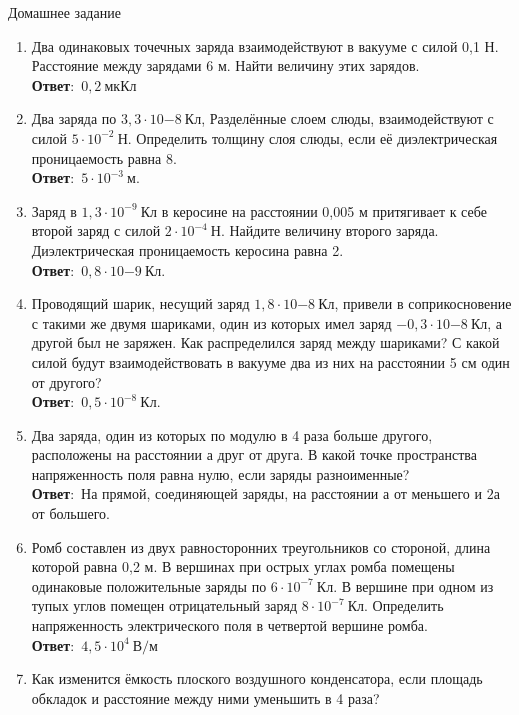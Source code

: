 \documentclass[a6paper, 11pt]{diss_4}
\renewcommand{\'}{\,'}
\begin{document}
\begin{center}
   Домашнее задание
\end{center}
\begin{enumerate}
\item Два одинаковых точечных заряда взаимодействуют в вакууме с силой 0,1 Н. Расстояние между зарядами 6 м. Найти величину этих зарядов.
\\\textbf{Ответ}:\ $0,2\ мкКл$
\item Два заряда по $3,3\cdot10{-8}\ Кл$, Разделённые слоем слюды, взаимодействуют с силой $5\cdot10^{-2}\ Н$. Определить толщину слоя слюды, если её диэлектрическая проницаемость равна 8.
\\\textbf{Ответ}:\ $5\cdot10^{-3}\ м$.
\item Заряд в $1,3\cdot10^{-9}\ Кл$ в керосине на расстоянии 0,005 м притягивает к себе второй заряд с силой $2\cdot10^{-4}\ Н$. Найдите величину второго заряда. Диэлектрическая проницаемость керосина равна 2.
\\\textbf{Ответ}:\ $0,8\cdot10{-9}\ Кл$.
\item Проводящий шарик, несущий заряд $1,8\cdot10{-8}\ Кл$, привели в соприкосновение с такими же двумя шариками, один из которых имел заряд $-0,3\cdot10{-8}\ Кл$, а другой был не заряжен. Как распределился заряд между шариками? С какой силой будут взаимодействовать в вакууме два из них на расстоянии 5 см один от другого?
\\\textbf{Ответ}:\ $0,5\cdot10^{-8}\ Кл$.
\item Два заряда, один из которых по модулю в 4 раза больше другого, расположены на расстоянии а друг от друга. В какой точке пространства напряженность поля равна нулю, если заряды разноименные?
\\\textbf{Ответ}:\  На прямой, соединяющей заряды, на расстоянии $а$ от меньшего и $2а$ от большего.
\item Ромб составлен из двух равносторонних треугольников со стороной, длина которой равна 0,2 м. В вершинах при острых углах ромба помещены одинаковые положительные заряды по $6\cdot10^{-7}\ Кл$. В вершине при одном из тупых углов помещен отрицательный заряд $8\cdot10^{-7}\ Кл$. Определить напряженность электрического поля в четвертой вершине ромба.
\\\textbf{Ответ}:\ $4,5\cdot10^{4}\ В/м$
\item Как изменится ёмкость плоского воздушного конденсатора, если площадь обкладок и расстояние между ними уменьшить в 4 раза?
\end{enumerate}
\end{document}
